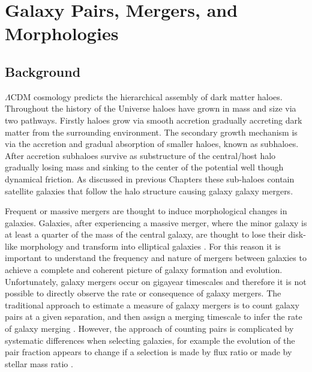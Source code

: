 
\chapter{Galaxy Pairs, Mergers, and Morphologies} 
\label{Chapter:GalPairs}

\section{Background}

$\Lambda$CDM cosmology predicts the hierarchical assembly of dark matter haloes.
Throughout the history of the Universe haloes have grown in mass and size via two pathways. 
Firstly haloes grow via smooth accretion gradually accreting dark matter from the surrounding environment. 
The secondary growth mechanism is via the accretion and gradual absorption of smaller haloes, known as subhaloes. 
After accretion subhaloes survive as substructure of the central/host halo gradually losing mass and sinking to the center of the potential well though dynamical friction. As discussed in previous Chapters these sub-haloes contain satellite galaxies that follow the halo structure causing galaxy galaxy mergers.

Frequent or massive mergers are thought to induce morphological changes in galaxies. 
Galaxies, after experiencing a massive merger, where the minor galaxy is at least a quarter of the mass of the central galaxy, are thought to lose their disk-like morphology and transform into elliptical galaxies \citep{Negroponte1983SimulationsGalaxies, DeLucia2006TheGalaxies}. 
For this reason it is important to understand the frequency and nature of mergers between galaxies to achieve a complete and coherent picture of galaxy formation and evolution. 
Unfortunately, galaxy mergers occur on gigayear timescales and therefore it is not possible to directly observe the rate or consequence of galaxy mergers. 
The traditional approach to estimate a measure of galaxy mergers is to count galaxy pairs at a given separation, and then assign a merging timescale to infer the rate of galaxy merging \citep{Conselice2003A3,Conselice2008TheField,Mundy2017A3.5,Duncan2019ObservationalFields}.
However, the approach of counting pairs is complicated by systematic differences when selecting galaxies, for example the evolution of the pair fraction appears to change if a selection is made by flux ratio or made by stellar mass ratio \citep{Man2016RESOLVING03}.

